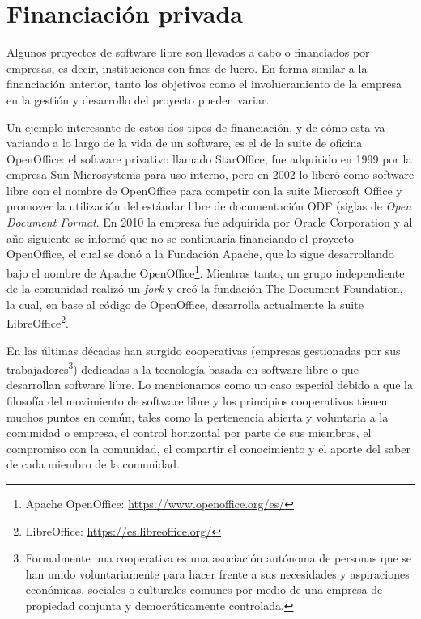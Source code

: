 \section{Financiación privada}\label{sec:finPrivada}

Algunos proyectos de software libre son llevados a cabo o financiados por empresas, es decir, instituciones con fines de lucro. En forma similar a la financiación anterior, tanto los objetivos como el involucramiento de la empresa en la gestión y desarrollo del proyecto pueden variar.

Un ejemplo interesante de estos dos tipos de financiación, y de cómo esta va variando a lo largo de la vida de un software, es el de la suite de oficina OpenOffice: el software privativo llamado StarOffice, fue adquirido en 1999 por la empresa Sun Microsystems para uso interno, pero en 2002 lo liberó como software libre con el nombre de OpenOffice para competir con la suite Microsoft Office y promover la utilización del estándar libre de documentación ODF (siglas de \emph{Open Document Format}. En 2010 la empresa fue adquirida por Oracle Corporation y al año siguiente se informó que no se continuaría financiando el proyecto OpenOffice, el cual se donó a la Fundación Apache, que lo sigue desarrollando bajo el nombre de Apache OpenOffice\footnote{Apache OpenOffice: \url{https://www.openoffice.org/es/}}. Mientras tanto, un grupo independiente de la comunidad realizó un \emph{fork} y creó la fundación The Document Foundation, la cual, en base al código de OpenOffice, desarrolla actualmente la suite LibreOffice\cite{watkins18}\footnote{LibreOffice: \url{https://es.libreoffice.org/}}.

En las últimas décadas han surgido cooperativas (empresas gestionadas por sus trabajadores\footnote{Formalmente una cooperativa es una asociación autónoma de personas que se han unido
voluntariamente para hacer frente a sus necesidades y aspiraciones económicas, sociales o culturales comunes por medio de una empresa de propiedad conjunta y democráticamente controlada.}) dedicadas a la tecnología basada en software libre o que desarrollan software libre. Lo mencionamos como un caso especial debido a que la filosofía del movimiento de software libre y los principios cooperativos tienen muchos puntos en común, tales como la pertenencia abierta y voluntaria a la comunidad o empresa, el control horizontal por parte de sus miembros, el compromiso con la comunidad, el compartir el conocimiento y el aporte del saber de cada miembro de la comunidad\cite{monk14}.

